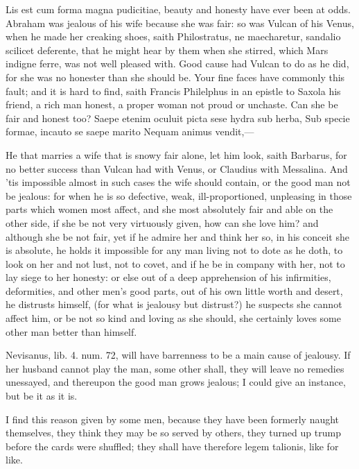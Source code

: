 {Lis est cum forma magna pudicitiae, beauty and honesty have ever
been at odds. Abraham was jealous of his wife because she was fair: so
was Vulcan of his Venus, when he made her creaking shoes, saith
Philostratus, ne maecharetur, sandalio scilicet deferente, that
he might hear by them when she stirred, which Mars indigne ferre,
was not well pleased with. Good cause had Vulcan to do as he did,
for she was no honester than she should be. Your fine faces have
commonly this fault; and it is hard to find, saith Francis Philelphus
in an epistle to Saxola his friend, a rich man honest, a proper woman
not proud or unchaste. Can she be fair and honest too?
Saepe etenim oculuit picta sese hydra sub herba,
Sub specie formae, incauto se saepe marito
Nequam animus vendit,---

He that marries a wife that is snowy fair alone, let him look, saith
 Barbarus, for no better success than Vulcan had with Venus, or
Claudius with Messalina. And 'tis impossible almost in such cases the
wife should contain, or the good man not be jealous: for when he is so
defective, weak, ill-proportioned, unpleasing in those parts which
women most affect, and she most absolutely fair and able on the other
side, if she be not very virtuously given, how can she love him? and
although she be not fair, yet if he admire her and think her so, in his
conceit she is absolute, he holds it impossible for any man living not
to dote as he doth, to look on her and not lust, not to covet, and if
he be in company with her, not to lay siege to her honesty: or else out
of a deep apprehension of his infirmities, deformities, and other men's
good parts, out of his own little worth and desert, he distrusts
himself, (for what is jealousy but distrust?) he suspects she cannot
affect him, or be not so kind and loving as she should, she certainly
loves some other man better than himself.

Nevisanus, lib. 4. num. 72, will have barrenness to be a main
cause of jealousy. If her husband cannot play the man, some other
shall, they will leave no remedies unessayed, and thereupon the good
man grows jealous; I could give an instance, but be it as it is.

I find this reason given by some men, because they have been formerly
naught themselves, they think they may be so served by others, they
turned up trump before the cards were shuffled; they shall have
therefore legem talionis, like for like.

}

